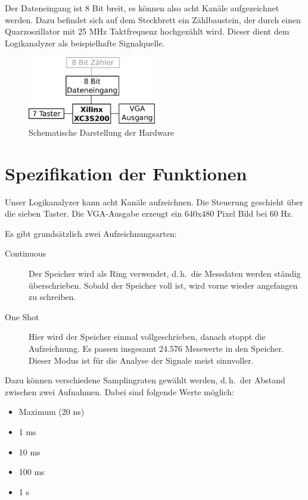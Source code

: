 \documentclass[IN,ngerman,utf8,12pt]{tumbook}
\newcommand{\dah}{d.\,h.\ }
\begin{document}
Der Dateneingang ist 8 Bit breit, es können also acht Kanäle aufgezeichnet werden.
Dazu befindet sich auf dem Steckbrett ein Zählbaustein, der durch einen Quarzoszillator mit 25 MHz Taktfrequenz hochgezählt wird.
Dieser dient dem Logikanalyzer als beispielhafte Signalquelle.

\begin{figure}
    \centerline{
        \includegraphics[width=0.5\textwidth]{img/hardware}
    }
    \caption{Schematische Darstellung der Hardware}
\end{figure}

\chapter{Spezifikation der Funktionen}

Unser Logikanalyzer kann acht Kanäle aufzeichnen.
Die Steuerung geschieht über die sieben Taster.
Die VGA-Ausgabe erzeugt ein 640x480 Pixel Bild bei 60 Hz.

Es gibt grundsätzlich zwei Aufzeichnungsarten:

\begin{description}
    \item[Continuous] Der Speicher wird als Ring verwendet, \dah die Messdaten werden ständig überschrieben.
        Sobald der Speicher voll ist, wird vorne wieder angefangen zu schreiben.
    \item[One Shot] Hier wird der Speicher einmal vollgeschrieben, danach stoppt die Aufzeichnung.
        Es passen insgesamt 24.576 Messwerte in den Speicher.
        Dieser Modus ist für die Analyse der Signale meist sinnvoller.
\end{description}

Dazu können verschiedene Samplingraten gewählt werden, \dah der Abstand zwischen zwei Aufnahmen.
Dabei sind folgende Werte möglich:

\begin{itemize}
    \item Maximum (20 ns)
    \item 1 ms
    \item 10 ms
    \item 100 ms
    \item 1 s
\end{itemize}
\end{document}
